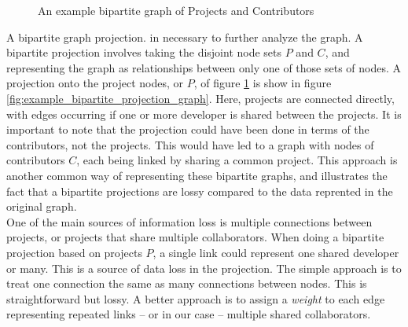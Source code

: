 \documentclass{proc}
\begin{document}
\begin{figure}
\label{fig:example_bipartite_graph}
\centering
{}
\caption{An example bipartite graph of Projects and Contributors}
\end{figure}

A bipartite graph projection. in necessary to further analyze the graph. A bipartite projection involves taking the disjoint node sets $P$ and $C$, and representing the graph as relationships between only one of those sets of nodes. A projection onto the project nodes, or $P$, of figure \ref{fig:example_bipartite_graph} is show in figure \ref{fig:example_bipartite_projection_graph}. Here, projects are connected directly, with edges occurring if one or more developer is shared between the projects. It is important to note that the projection could have been done in terms of the contributors, not the projects. This would have led to a graph with nodes of contributors $C$, each being linked by sharing a common project. This approach is another common way of representing these bipartite graphs\cite{newman2001scientific}, and illustrates the fact that a bipartite projections are lossy compared to the data reprented in the original graph\cite{zhou2007bipartite}.\\

One of the main sources of information loss is multiple connections between projects, or projects that share multiple collaborators. When doing a bipartite projection based on projects $P$, a single link could represent one shared developer or many. This is a source of data loss in the projection. The simple approach is to treat one connection the same as many connections between nodes. This is straightforward but lossy\cite{zhou2007bipartite,grossman1995portion}. A better approach is to assign a \textit{weight} to each edge representing repeated links -- or in our case -- multiple shared collaborators\cite{zha2001bipartite,barrat2004architecture}.
\end{document}

